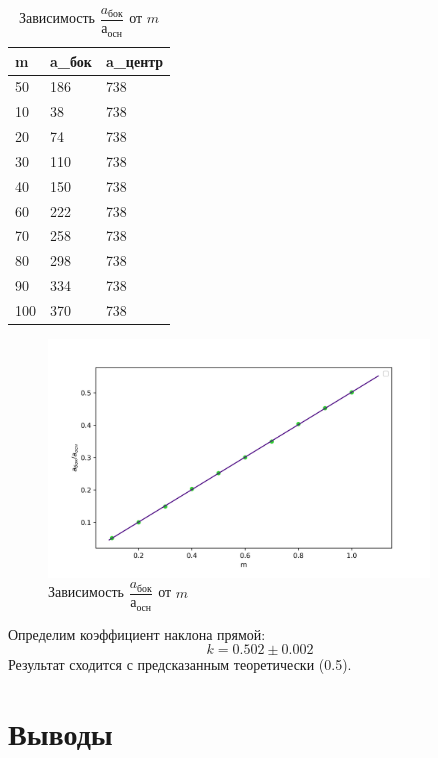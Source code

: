 \documentclass[a4paper,12pt]{article} %
\begin{document}
\begin{table}[h!]
\caption{Зависимость $\dfrac{a_{бок}}{а_{осн}}$ от $m$}
\label{mod_tbl}
\begin{tabular}{|l|l|l|}
\hline
m   & a\_бок & a\_центр \\ \hline
50  & 186    & 738      \\ \hline
10  & 38     & 738      \\ \hline
20  & 74     & 738      \\ \hline
30  & 110    & 738      \\ \hline
40  & 150    & 738      \\ \hline
60  & 222    & 738      \\ \hline
70  & 258    & 738      \\ \hline
80  & 298    & 738      \\ \hline
90  & 334    & 738      \\ \hline
100 & 370    & 738      \\ \hline
\end{tabular}
\end{table}
\begin{figure}[h!]
\begin{center}
\includegraphics[width=0.9\textwidth]{a(m)}
\caption{Зависимость $\dfrac{a_{бок}}{а_{осн}}$ от $m$} \label{mod_img}
\end{center}
\end{figure}
Определим коэффициент наклона прямой:
\begin{equation}
k = 0.502 \pm 0.002
\end{equation} 
Результат сходится с предсказанным теоретически (0.5).

\section{Выводы}
\end{document}
